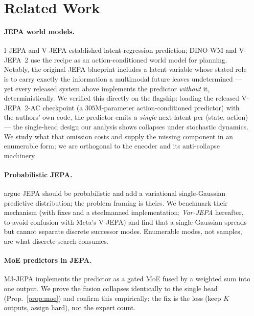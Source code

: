 \documentclass[letterpaper]{article}
\begin{document}
\section{Related Work}

\paragraph{JEPA world models.}
I-JEPA \citep{assran2023ijepa} and V-JEPA \citep{bardes2024vjepa} established latent-regression
prediction; DINO-WM \citep{zhou2024dinowm} and V-JEPA~2 \citep{assran2025vjepa2} use the recipe as an
action-conditioned world model for planning. Notably, the original JEPA blueprint \citep{lecun2022path}
includes a latent variable whose stated role is to carry exactly the information a multimodal future
leaves undetermined --- yet every released system above implements the predictor \emph{without} it,
deterministically. We verified this directly on the flagship: loading the released V-JEPA~2-AC checkpoint
(a $305$M-parameter action-conditioned predictor) with the authors' own code, the predictor emits a
\emph{single} next-latent per (state, action) --- the single-head design our analysis shows collapses
under stochastic dynamics. We study what that omission costs and supply the missing component in an
enumerable form; we are orthogonal to the encoder and its anti-collapse machinery \citep{bardes2022vicreg}.

\paragraph{Probabilistic JEPA.}
\citet{huang2026varjepa} argue JEPA should be probabilistic and add a variational single-Gaussian
predictive distribution; the problem framing is theirs. We benchmark their mechanism (with fixes and a
steelmanned implementation; \emph{Var-JEPA} hereafter, to avoid confusion with Meta's V-JEPA) and find
that a single Gaussian spreads but cannot separate discrete successor modes. Enumerable modes, not
samples, are what discrete search consumes.

\paragraph{MoE predictors in JEPA.}
M3-JEPA \citep{lei2024m3jepa} implements the predictor as a gated MoE fused by a weighted sum into one
output. We prove the fusion collapses identically to the single head (Prop.~\ref{prop:moe}) and confirm
this empirically; the fix is the loss (keep $K$ outputs, assign hard), not the expert count.
\end{document}

